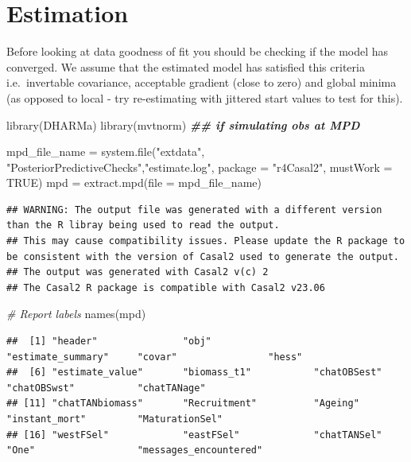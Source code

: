 \documentclass[
]{book}
\newenvironment{Shaded}{\begin{snugshade}}{\end{snugshade}}
\newcommand{\AttributeTok}[1]{\textcolor[rgb]{0.77,0.63,0.00}{#1}}
\newcommand{\CommentTok}[1]{\textcolor[rgb]{0.56,0.35,0.01}{\textit{#1}}}
\newcommand{\ConstantTok}[1]{\textcolor[rgb]{0.00,0.00,0.00}{#1}}
\newcommand{\DocumentationTok}[1]{\textcolor[rgb]{0.56,0.35,0.01}{\textbf{\textit{#1}}}}
\newcommand{\FunctionTok}[1]{\textcolor[rgb]{0.00,0.00,0.00}{#1}}
\newcommand{\NormalTok}[1]{#1}
\newcommand{\OtherTok}[1]{\textcolor[rgb]{0.56,0.35,0.01}{#1}}
\newcommand{\StringTok}[1]{\textcolor[rgb]{0.31,0.60,0.02}{#1}}
\begin{document}
\hypertarget{estimation}{%
\section{Estimation}\label{estimation}}

Before looking at data goodness of fit you should be checking if the model has converged. We assume that the estimated model has satisfied this criteria i.e.~invertable covariance, acceptable gradient (close to zero) and global minima (as opposed to local - try re-estimating with jittered start values to test for this).

\begin{Shaded}
\begin{Highlighting}[]
\FunctionTok{library}\NormalTok{(DHARMa)}
\FunctionTok{library}\NormalTok{(mvtnorm) }\DocumentationTok{\#\# if simulating obs at MPD}

\NormalTok{mpd\_file\_name }\OtherTok{=} \FunctionTok{system.file}\NormalTok{(}\StringTok{"extdata"}\NormalTok{, }\StringTok{"PosteriorPredictiveChecks"}\NormalTok{,}\StringTok{"estimate.log"}\NormalTok{, }
                            \AttributeTok{package =} \StringTok{"r4Casal2"}\NormalTok{, }\AttributeTok{mustWork =} \ConstantTok{TRUE}\NormalTok{)}
\NormalTok{mpd }\OtherTok{=} \FunctionTok{extract.mpd}\NormalTok{(}\AttributeTok{file =}\NormalTok{ mpd\_file\_name)}
\end{Highlighting}
\end{Shaded}

\begin{verbatim}
## WARNING: The output file was generated with a different version than the R libray being used to read the output.
## This may cause compatibility issues. Please update the R package to be consistent with the version of Casal2 used to generate the output.
## The output was generated with Casal2 v(c) 2
## The Casal2 R package is compatible with Casal2 v23.06
\end{verbatim}

\begin{Shaded}
\begin{Highlighting}[]
\CommentTok{\# Report labels}
\FunctionTok{names}\NormalTok{(mpd)}
\end{Highlighting}
\end{Shaded}

\begin{verbatim}
##  [1] "header"               "obj"                  "estimate_summary"     "covar"                "hess"                
##  [6] "estimate_value"       "biomass_t1"           "chatOBSest"           "chatOBSwst"           "chatTANage"          
## [11] "chatTANbiomass"       "Recruitment"          "Ageing"               "instant_mort"         "MaturationSel"       
## [16] "westFSel"             "eastFSel"             "chatTANSel"           "One"                  "messages_encountered"
\end{verbatim}
\end{document}
